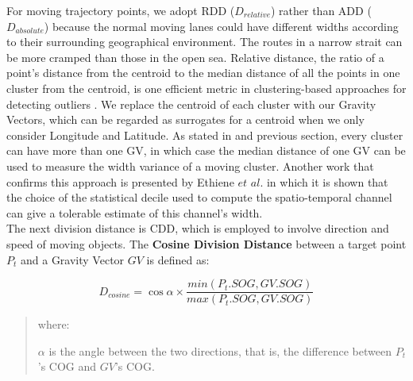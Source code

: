\documentclass[12pt,glossary]{dalcsthesis}
\begin{document}

For moving trajectory points, we adopt RDD ($D_{relative}$) rather than ADD ($D_{absolute}$) because the normal moving lanes could have different widths according to their surrounding geographical environment. The routes in a narrow strait can be more cramped than those in the open sea. Relative distance, the ratio of a point's distance from the centroid to the median distance of all the points in one cluster from the centroid, is one efficient metric in clustering-based approaches for detecting outliers \cite{PangNing05}. We replace the centroid of each cluster with our Gravity Vectors, which can be regarded as surrogates for a centroid when we only consider Longitude and Latitude.
As stated in \cite{bigdata2014} and previous section, every cluster can have more than one GV, in which case the median distance %
of one GV
can be used to measure the width variance of a moving cluster. Another work that confirms this approach is presented by Ethiene $et$ $al.$ \cite{Etienne12} in which it is shown that
the choice of the statistical decile used to compute the spatio-temporal channel can give a tolerable estimate of this channel's width.\\

The next division distance is CDD, which is employed to involve direction and speed of moving objects. The \textbf{Cosine Division Distance} between a target point $P_t$ and a Gravity Vector $GV$ is defined as:

\begin{equation}
\label{eq:cdd}
D_{cosine} = \cos\alpha\times\frac{min(P_t.SOG,GV.SOG)}{max(P_t.SOG,GV.SOG)}
\end{equation}
\begin{quote}
where:

 $\alpha$ is the angle between the two directions, that is, the difference between $P_t$'s COG and $GV$'s COG. \\
\end{quote}
\end{document}
